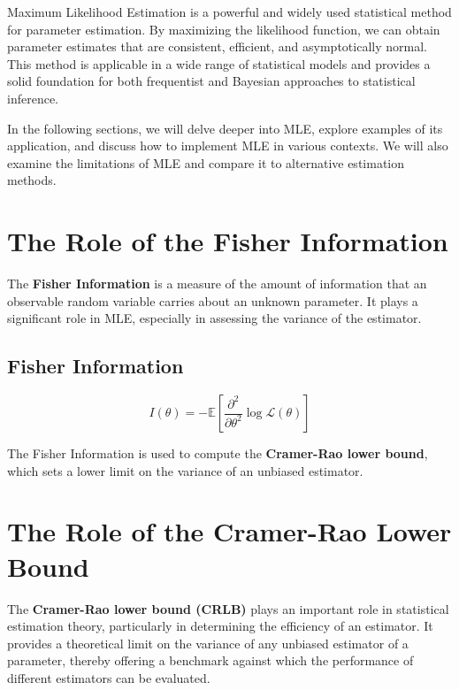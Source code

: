 \documentclass[
  12 pt,
  a4paper,
]{book}
\numberwithin{equation}{section}
\theoremstyle{plain}      %
\theoremstyle{definition} %
\theoremstyle{remark}     %
\theoremstyle{note}         %
\begin{document}
Maximum Likelihood Estimation is a powerful and widely used statistical
method for parameter estimation. By maximizing the likelihood function,
we can obtain parameter estimates that are consistent, efficient, and
asymptotically normal. This method is applicable in a wide range of
statistical models and provides a solid foundation for both frequentist
and Bayesian approaches to statistical inference.

In the following sections, we will delve deeper into MLE, explore
examples of its application, and discuss how to implement MLE in various
contexts. We will also examine the limitations of MLE and compare it to
alternative estimation methods.

\newpage

\hypertarget{the-role-of-the-fisher-information}{%
\section{The Role of the Fisher
Information}\label{the-role-of-the-fisher-information}}

The \textbf{Fisher Information} is a measure of the amount of
information that an observable random variable carries about an unknown
parameter. It plays a significant role in MLE, especially in assessing
the variance of the estimator.

\hypertarget{fisher-information}{%
\subsection{Fisher Information}\label{fisher-information}}

\[
I(\theta) = -\mathbb{E} \left[ \frac{\partial^2}{\partial \theta^2} \log \mathcal{L}(\theta) \right]
\]

The Fisher Information is used to compute the \textbf{Cramer-Rao lower
bound}, which sets a lower limit on the variance of an unbiased
estimator.

\hypertarget{the-role-of-the-cramer-rao-lower-bound}{%
\section{The Role of the Cramer-Rao Lower
Bound}\label{the-role-of-the-cramer-rao-lower-bound}}

The \textbf{Cramer-Rao lower bound (CRLB)} plays an important role in
statistical estimation theory, particularly in determining the
efficiency of an estimator. It provides a theoretical limit on the
variance of any unbiased estimator of a parameter, thereby offering a
benchmark against which the performance of different estimators can be
evaluated.
\end{document}

